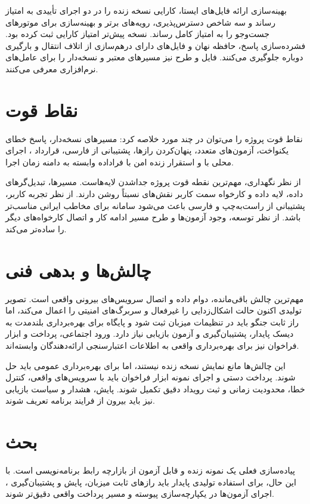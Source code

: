بهینه‌سازی ارائه فایل‌های ایستا، کارایی نسخه زنده  را در دو اجرای تأییدی به امتیاز  رساند و سه شاخص دسترس‌پذیری، رویه‌های برتر و بهینه‌سازی برای موتورهای جست‌وجو را به امتیاز کامل  رساند. نسخه  پیش‌تر امتیاز کارایی  ثبت کرده بود. فشرده‌سازی پاسخ، حافظه نهان و فایل‌های دارای درهم‌سازی از اتلاف انتقال و بارگیری دوباره جلوگیری می‌کنند. فایل  و طرح  نیز مسیرهای معتبر و نسخه‌دار را برای عامل‌های نرم‌افزاری معرفی می‌کنند.

\section{نقاط قوت}
نقاط قوت پروژه را می‌توان در چند مورد خلاصه کرد: مسیرهای نسخه‌دار، پاسخ خطای یکنواخت، آزمون‌های متعدد، پنهان‌کردن رازها، پشتیبانی از فارسی، قرارداد ، اجرای محلی با  و استقرار زنده امن با فراداده وابسته به دامنه زمان اجرا.

از نظر نگهداری، مهم‌ترین نقطه قوت پروژه جداشدن لایه‌هاست. مسیرها، تبدیل‌گرهای داده، لایه داده و کارخواه سمت کاربر نقش‌های نسبتاً روشن دارند. از نظر تجربه کاربر، پشتیبانی از راست‌به‌چپ و فارسی باعث می‌شود سامانه برای مخاطب ایرانی مناسب‌تر باشد. از نظر توسعه، وجود آزمون‌ها و طرح  مسیر ادامه کار و اتصال کارخواه‌های دیگر را ساده‌تر می‌کند.

\section{چالش‌ها و بدهی فنی}
مهم‌ترین چالش باقی‌مانده، دوام داده و اتصال سرویس‌های بیرونی واقعی است. تصویر تولیدی اکنون حالت اشکال‌زدایی را غیرفعال و سربرگ‌های امنیتی را اعمال می‌کند، اما راز ثابت جنگو باید در تنظیمات میزبان ثبت شود و پایگاه  برای بهره‌برداری بلندمدت به دیسک پایدار، پشتیبان‌گیری و آزمون بازیابی نیاز دارد. ورود اجتماعی، پرداخت و ابزار فراخوان نیز برای بهره‌برداری واقعی به اطلاعات اعتبارسنجی ارائه‌دهندگان وابسته‌اند.

این چالش‌ها مانع نمایش نسخه زنده نیستند، اما برای بهره‌برداری عمومی باید حل شوند. پرداخت دستی و اجرای نمونه ابزار فراخوان باید با سرویس‌های واقعی، کنترل خطا، محدودیت زمانی و ثبت رویداد دقیق تکمیل شوند. پایش، هشدار و سیاست بازیابی نیز باید بیرون از فرایند برنامه تعریف شوند.

\section{بحث}
پیاده‌سازی فعلی یک نمونه زنده و قابل آزمون از بازارچه رابط برنامه‌نویسی است. با این حال، برای استفاده تولیدی پایدار باید رازهای ثابت میزبان، پایش و پشتیبان‌گیری ، اجرای آزمون‌ها در یکپارچه‌سازی پیوسته و مسیر پرداخت واقعی دقیق‌تر شوند.

